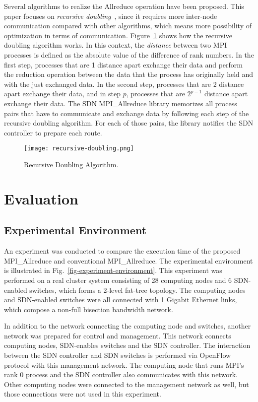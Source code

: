 Several algorithms to realize the Allreduce operation have been proposed. This
paper focuses on \emph{recursive doubling}~\autocite{Thakur2005}, since it
requires more inter-node communication compared with other algorithms, which
means more possibility of optimization in terms of communication.
Figure~\ref{fig-recursive-doubling} shows how the recursive doubling algorithm
works. In this context, the \emph{distance} between two MPI processes is
defined as the absolute value of the difference of rank numbers. In the first
step, processes that are 1 distance apart exchange their data and perform the
reduction operation between the data that the process has originally held and
with the just exchanged data. In the second step, processes that are 2
distance apart exchange their data, and in step \(p\), processes that are
\(2^{p - 1}\) distance apart exchange their data. The SDN MPI\_Allreduce
library memorizes all process pairs that have to communicate and exchange data
by following each step of the recursive doubling algorithm. For each of those
pairs, the library notifies the SDN controller to prepare each route.

\begin{figure}
    \centering
    \texttt{[image: recursive-doubling.png]}
    \caption{Recursive Doubling Algorithm.}%
    \label{fig-recursive-doubling}
\end{figure}

\section{Evaluation}\label{iii-evaluation}

\subsection{Experimental Environment}

An experiment was conducted to compare the execution time of the
proposed MPI\_Allreduce and conventional
MPI\_Allreduce. The experimental environment is illustrated in
Fig.~\ref{fig-experiment-environment}. This experiment was performed on
a real cluster system consisting of 28 computing nodes and 6 SDN-enabled
switches, which forms a 2-level fat-tree topology. The computing nodes
and SDN-enabled switches were all connected with 1 Gigabit Ethernet
links, which compose a non-full bisection bandwidth network.

In addition to the network connecting the computing node and switches,
another network was prepared for control and management. This network
connects computing nodes, SDN-enables switches and the SDN controller.
The interaction between the SDN controller and SDN switches is performed
via OpenFlow protocol with this management network. The computing node
that runs MPI's rank 0 process and the SDN controller also communicates
with this network. Other computing nodes were connected to the
management network as well, but those connections were not used in this
experiment.

